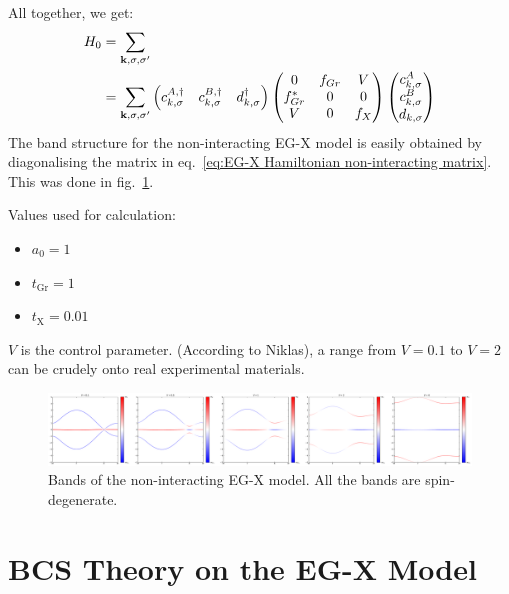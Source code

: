 All together, we get:
\begin{align}
    H_0 &= \sum_{\bm{\mathrm{k}}, \sigma, \sigma^{\prime}}
    \\
    &= \sum_{\bm{\mathrm{k}}, \sigma, \sigma^{\prime}} \begin{pmatrix} c_{k, \sigma}^{A, \dagger} & c_{k, \sigma}^{B, \dagger} & d_{k, \sigma}^{\dagger} \end{pmatrix}
    \begin{pmatrix}
        0 & f_{Gr} & V \\
        f_{Gr}^* & 0 & 0 \\
        V & 0 & f_{X}
    \end{pmatrix} \begin{pmatrix} c_{k, \sigma}^{A} \\ c_{k, \sigma}^{B} \\ d_{k, \sigma} \end{pmatrix}
    \label{eq:EG-X Hamiltonian non-interacting matrix}
\end{align}
The band structure for the non-interacting EG-X model is easily obtained by diagonalising the matrix in eq.~\ref{eq:EG-X Hamiltonian non-interacting matrix}.
This was done in fig.~\ref{fig:EG-X model non-interacting bands}.

Values used for calculation:
\begin{itemize}
    \item \(a_0 = 1\)
    \item \(t_{\mathrm{Gr}} = 1\)
    \item \(t_{\mathrm{X}} = 0.01\)
\end{itemize}
\(V\) is the control parameter.
(According to Niklas), a range from \(V = 0.1\) to \(V = 2\) can be crudely onto real experimental materials.

\begin{figure}[t]
    \centering
    \includegraphics[width=\textwidth]{images/EG_X bands_tGr_1_tX_0.01}
    \caption{Bands of the non-interacting EG-X model. All the bands are spin-degenerate.}
    \label{fig:EG-X model non-interacting bands}
\end{figure}

\section{BCS Theory on the EG-X Model}\label{sec:bcs-theory-on-the-eg-x-model}

